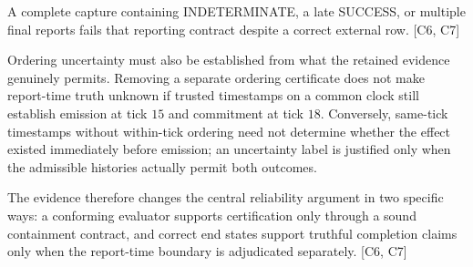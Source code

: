 \documentclass[11pt]{article}
\begin{document}
A complete capture containing INDETERMINATE, a late SUCCESS, or multiple final reports fails that reporting contract despite a correct external row. [C6, C7]

Ordering uncertainty must also be established from what the retained evidence genuinely permits. Removing a separate ordering certificate does not make report-time truth unknown if trusted timestamps on a common clock still establish emission at tick $15$ and commitment at tick $18$. Conversely, same-tick timestamps without within-tick ordering need not determine whether the effect existed immediately before emission; an uncertainty label is justified only when the admissible histories actually permit both outcomes.

The evidence therefore changes the central reliability argument in two specific ways: a conforming evaluator supports certification only through a sound containment contract, and correct end states support truthful completion claims only when the report-time boundary is adjudicated separately. [C6, C7]
\end{document}
